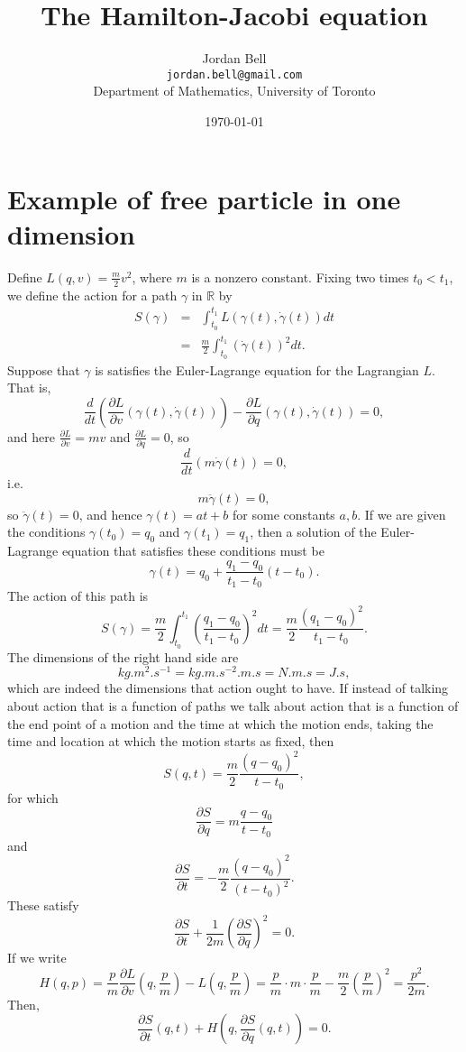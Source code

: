 \documentclass{article}
\theoremstyle{definition}
\begin{document}
\title{The Hamilton-Jacobi equation}
\author{Jordan Bell\\ \texttt{jordan.bell@gmail.com}\\Department of Mathematics, University of Toronto}
\date{\today}

\maketitle

\section{Example of free particle in one dimension}
Define $L(q,v)=\frac{m}{2}v^2$, where $m$ is a nonzero constant. Fixing two times $t_0<t_1$, we define the action for a path $\gamma$ in $\mathbb{R}$ by
\begin{eqnarray*}
S(\gamma) &=& \int_{t_0}^{t_1} L(\gamma(t),\dot{\gamma}(t)) dt\\
&=&\frac{m}{2} \int_{t_0}^{t_1} (\dot{\gamma}(t))^2 dt. 
\end{eqnarray*}
Suppose that $\gamma$ is satisfies the Euler-Lagrange equation for the Lagrangian $L$. That is,
\[
\frac{d}{dt} \left(\frac{\partial L}{\partial v}(\gamma(t),\dot{\gamma}(t)) \right)  - \frac{\partial L}{\partial q}(\gamma(t),\dot{\gamma}(t)) = 0,
\]
and here $\frac{\partial L}{\partial v}=mv$ and $\frac{\partial L}{\partial q}=0$, so
\[
\frac{d}{dt} (m \dot{\gamma}(t))=0,
\]
i.e.
\[
m\ddot{\gamma}(t)=0,
\]
so $\ddot{\gamma}(t)=0$, and hence $\gamma(t)=at+b$ for some constants $a,b$. If we are given the conditions $\gamma(t_0)=q_0$
and $\gamma(t_1)=q_1$, then a solution of the Euler-Lagrange equation that satisfies these conditions must be
\[
\gamma(t) = q_0 + \frac{q_1-q_0}{t_1-t_0} ( t-t_0).
\]
The action of this path is
\[
S(\gamma)=\frac{m}{2} \int_{t_0}^{t_1} \left(\frac{q_1-q_0}{t_1-t_0} \right)^2 dt=
\frac{m}{2} \frac{(q_1-q_0)^2}{t_1-t_0}.
\]
The dimensions of the right hand side are 
\[
\si{kg. m^2 . s^{-1}}=\si{kg . m . s^{-2} . m. s}=\si{N . m . s} = \si{J.s},
\]
 which are indeed the dimensions
that action ought to have.
If instead of talking about action that is a function of paths we talk about action that is a function of the end point of a motion and the time
at which the motion ends, taking the time and location at which the motion starts as fixed, then
\[
S(q,t) = \frac{m}{2} \frac{(q-q_0)^2}{t-t_0},
\]
for which
\[
\frac{\partial S}{\partial q} = m \frac{q-q_0}{t-t_0}
\]
and
\[
\frac{\partial S}{\partial t} = - \frac{m}{2} \frac{(q-q_0)^2}{(t-t_0)^2}.
\]
These satisfy
\[
\frac{\partial S}{\partial t}  + \frac{1}{2m} \left(\frac{\partial S}{\partial q}\right)^2=0.
\]
If we write
\[
H(q,p) = \frac{p}{m} \frac{\partial L}{\partial v}\left(q,\frac{p}{m} \right)  - L\left(q,\frac{p}{m}\right) = \frac{p}{m} \cdot m \cdot \frac{p}{m} - \frac{m}{2} \left( \frac{p}{m}\right)^2 = 
\frac{p^2}{2m}.
\]
Then,
\[
\frac{\partial S}{\partial t}(q,t) + H\left(q,\frac{\partial S}{\partial q}(q,t) \right)=0.
\]
\end{document}

